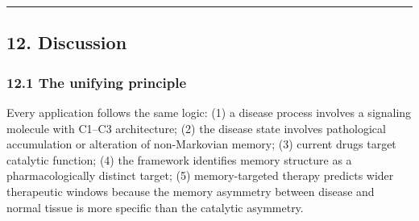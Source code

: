 \documentclass[
  11pt,
]{article}
\begin{document}
\begin{center}\rule{0.5\linewidth}{0.5pt}\end{center}

\hypertarget{discussion}{%
\subsection{12. Discussion}\label{discussion}}

\hypertarget{the-unifying-principle}{%
\subsubsection{12.1 The unifying
principle}\label{the-unifying-principle}}

Every application follows the same logic: (1) a disease process involves
a signaling molecule with C1--C3 architecture; (2) the disease state
involves pathological accumulation or alteration of non-Markovian
memory; (3) current drugs target catalytic function; (4) the framework
identifies memory structure as a pharmacologically distinct target; (5)
memory-targeted therapy predicts wider therapeutic windows because the
memory asymmetry between disease and normal tissue is more specific than
the catalytic asymmetry.
\end{document}
